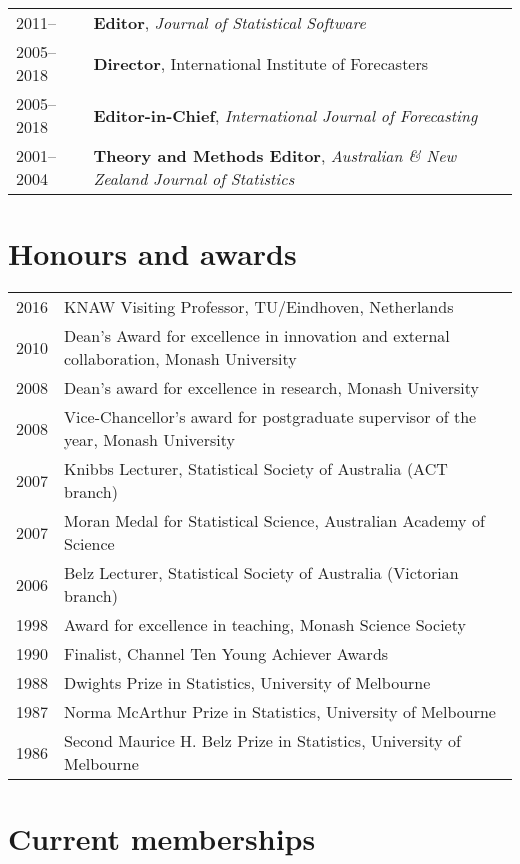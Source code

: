 \documentclass[10pt,a4paper,]{article}
\begin{document}
\begin{tabular}{ll}
  2011-- & \textbf{Editor}, \textit{Journal of Statistical Software} \\ 
  2005--2018 & \textbf{Director}, International Institute of Forecasters \\ 
  2005--2018 & \textbf{Editor-in-Chief}, \textit{International Journal of Forecasting} \\ 
  2001--2004 & \textbf{Theory and Methods Editor}, \emph{Australian \& New Zealand Journal of Statistics} \\ 
  \end{tabular}

\hypertarget{honours-and-awards}{%
\section{Honours and awards}\label{honours-and-awards}}

\begin{tabular}{rl}
  2016 & KNAW Visiting Professor, TU/Eindhoven, Netherlands \\ 
  2010 & Dean's Award for excellence in innovation and external collaboration, Monash University \\ 
  2008 & Dean's award for excellence in research, Monash University \\ 
  2008 & Vice-Chancellor's award for postgraduate supervisor of the year, Monash University \\ 
  2007 & Knibbs Lecturer, Statistical Society of Australia (ACT branch) \\ 
  2007 & Moran Medal for Statistical Science, Australian Academy of Science \\ 
  2006 & Belz Lecturer, Statistical Society of Australia (Victorian branch) \\ 
  1998 & Award for excellence in teaching, Monash Science Society \\ 
  1990 & Finalist, Channel Ten Young Achiever Awards \\ 
  1988 & Dwights Prize in Statistics, University of Melbourne \\ 
  1987 & Norma McArthur Prize in Statistics, University of Melbourne \\ 
  1986 & Second Maurice H. Belz Prize in Statistics, University of Melbourne \\ 
  \end{tabular}

\hypertarget{current-memberships}{%
\section{Current memberships}\label{current-memberships}}
\end{document}

